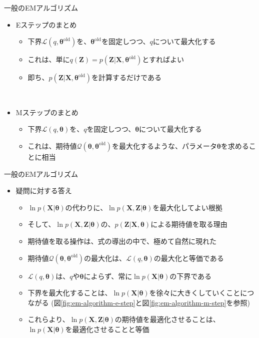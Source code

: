 \documentclass[dvipdfmx,notheorems,t]{beamer}
\begin{document}
\begin{frame}{一般のEMアルゴリズム}

\begin{itemize}
	\item \alert{Eステップ}のまとめ
	\begin{itemize}
		\item 下界$\mathcal{L}(q, \bm{\theta}^\mathrm{old})$を、\color{red}$\bm{\theta}^\mathrm{old}$を固定しつつ、$q$について最大化\normalcolor する
		\item これは、単に$q(\bm{Z}) = p(\bm{Z} | \bm{X}, \bm{\theta}^\mathrm{old})$とすればよい
		\item 即ち、$p(\bm{Z} | \bm{X}, \bm{\theta}^\mathrm{old})$を計算するだけである
	\end{itemize} \
	
	\item \alert{Mステップ}のまとめ
	\begin{itemize}
		\item 下界$\mathcal{L}(q, \bm{\theta})$を、\color{red}$q$を固定しつつ、$\bm{\theta}$について最大化\normalcolor する
		\item これは、期待値$\mathcal{Q}(\bm{\theta}, \bm{\theta}^\mathrm{old})$を最大化するような、パラメータ$\bm{\theta}$を求めることに相当
	\end{itemize}
\end{itemize}

\end{frame}

\begin{frame}{一般のEMアルゴリズム}

\begin{itemize}
	\item 疑問に対する答え
	\begin{itemize}
		\item $\ln p(\bm{X} | \bm{\theta})$の代わりに、$\ln p(\bm{X}, \bm{Z} | \bm{\theta})$を最大化してよい根拠
		\item そして、$\ln p(\bm{X}, \bm{Z} | \bm{\theta})$の、$p(\bm{Z} | \bm{X}, \bm{\theta})$による期待値を取る理由
		\newline
		\item 期待値を取る操作は、式の導出の中で、極めて自然に現れた
		\item 期待値$\mathcal{Q}(\bm{\theta}, \bm{\theta}^\mathrm{old})$の最大化は、$\mathcal{L}(q, \bm{\theta})$の最大化と等価である
		\item $\mathcal{L}(q, \bm{\theta})$は、$q$や$\bm{\theta}$によらず、常に$\ln p(\bm{X} | \bm{\theta})$の下界である
		\item 下界を最大化することは、$\ln p(\bm{X} | \bm{\theta})$を徐々に大きくしていくことにつながる (図\ref{fig:em-algorithm-e-step}と図\ref{fig:em-algorithm-m-step}を参照)
		\newline
		\item これらより、$\ln p(\bm{X}, \bm{Z} | \bm{\theta})$の期待値を最適化させることは、$\ln p(\bm{X} | \bm{\theta})$を最適化させることと等価
	\end{itemize}
\end{itemize}

\end{frame}
\end{document}
